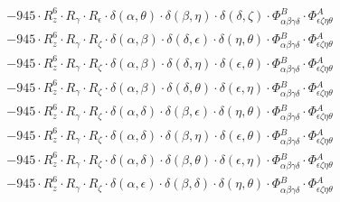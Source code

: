 \documentclass{article}
\begin{document}
\begin{equation}
\begin{array}{c}
 \\[0.2em] 		 - 945 \cdot R_{z}^{6} \cdot R_{\gamma{}} \cdot R_{\epsilon{}} \cdot \delta{}\left(\alpha{}, \theta{}\right) \cdot \delta{}\left(\beta{}, \eta{}\right) \cdot \delta{}\left(\delta{}, \zeta{}\right) \cdot \Phi{}^{B}_{\alpha{}\beta{}\gamma{}\delta{}} \cdot \Phi{}^{A}_{\epsilon{}\zeta{}\eta{}\theta{}} 
 \\[0.2em] 		 - 945 \cdot R_{z}^{6} \cdot R_{\gamma{}} \cdot R_{\zeta{}} \cdot \delta{}\left(\alpha{}, \beta{}\right) \cdot \delta{}\left(\delta{}, \epsilon{}\right) \cdot \delta{}\left(\eta{}, \theta{}\right) \cdot \Phi{}^{B}_{\alpha{}\beta{}\gamma{}\delta{}} \cdot \Phi{}^{A}_{\epsilon{}\zeta{}\eta{}\theta{}} 
 \\[0.2em] 		 - 945 \cdot R_{z}^{6} \cdot R_{\gamma{}} \cdot R_{\zeta{}} \cdot \delta{}\left(\alpha{}, \beta{}\right) \cdot \delta{}\left(\delta{}, \eta{}\right) \cdot \delta{}\left(\epsilon{}, \theta{}\right) \cdot \Phi{}^{B}_{\alpha{}\beta{}\gamma{}\delta{}} \cdot \Phi{}^{A}_{\epsilon{}\zeta{}\eta{}\theta{}} 
 \\[0.2em] 		 - 945 \cdot R_{z}^{6} \cdot R_{\gamma{}} \cdot R_{\zeta{}} \cdot \delta{}\left(\alpha{}, \beta{}\right) \cdot \delta{}\left(\delta{}, \theta{}\right) \cdot \delta{}\left(\epsilon{}, \eta{}\right) \cdot \Phi{}^{B}_{\alpha{}\beta{}\gamma{}\delta{}} \cdot \Phi{}^{A}_{\epsilon{}\zeta{}\eta{}\theta{}} 
 \\[0.2em] 		 - 945 \cdot R_{z}^{6} \cdot R_{\gamma{}} \cdot R_{\zeta{}} \cdot \delta{}\left(\alpha{}, \delta{}\right) \cdot \delta{}\left(\beta{}, \epsilon{}\right) \cdot \delta{}\left(\eta{}, \theta{}\right) \cdot \Phi{}^{B}_{\alpha{}\beta{}\gamma{}\delta{}} \cdot \Phi{}^{A}_{\epsilon{}\zeta{}\eta{}\theta{}} 
 \\[0.2em] 		 - 945 \cdot R_{z}^{6} \cdot R_{\gamma{}} \cdot R_{\zeta{}} \cdot \delta{}\left(\alpha{}, \delta{}\right) \cdot \delta{}\left(\beta{}, \eta{}\right) \cdot \delta{}\left(\epsilon{}, \theta{}\right) \cdot \Phi{}^{B}_{\alpha{}\beta{}\gamma{}\delta{}} \cdot \Phi{}^{A}_{\epsilon{}\zeta{}\eta{}\theta{}} 
 \\[0.2em] 		 - 945 \cdot R_{z}^{6} \cdot R_{\gamma{}} \cdot R_{\zeta{}} \cdot \delta{}\left(\alpha{}, \delta{}\right) \cdot \delta{}\left(\beta{}, \theta{}\right) \cdot \delta{}\left(\epsilon{}, \eta{}\right) \cdot \Phi{}^{B}_{\alpha{}\beta{}\gamma{}\delta{}} \cdot \Phi{}^{A}_{\epsilon{}\zeta{}\eta{}\theta{}} 
 \\[0.2em] 		 - 945 \cdot R_{z}^{6} \cdot R_{\gamma{}} \cdot R_{\zeta{}} \cdot \delta{}\left(\alpha{}, \epsilon{}\right) \cdot \delta{}\left(\beta{}, \delta{}\right) \cdot \delta{}\left(\eta{}, \theta{}\right) \cdot \Phi{}^{B}_{\alpha{}\beta{}\gamma{}\delta{}} \cdot \Phi{}^{A}_{\epsilon{}\zeta{}\eta{}\theta{}} 

\end{array}
\end{equation}
\end{document}
